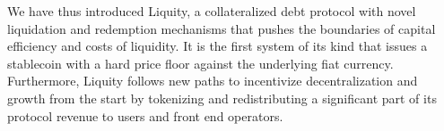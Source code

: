 \documentclass{article}
\begin{document}
We have thus introduced Liquity, a collateralized debt protocol with novel liquidation and redemption mechanisms that pushes the boundaries of capital efficiency and costs of liquidity. It is the first system of its kind that issues a stablecoin with a hard price floor against the underlying fiat currency. Furthermore, Liquity follows new paths to incentivize decentralization and growth from the start by tokenizing and redistributing a significant part of its protocol revenue to users and front end operators. 
\end{document}
